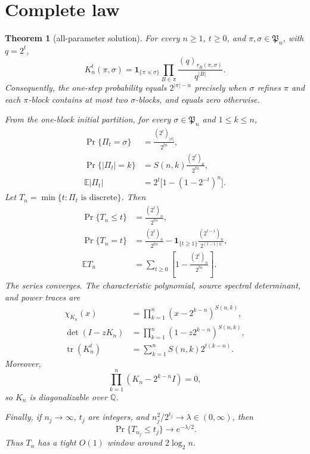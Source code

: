\documentclass[10pt]{article}
\newtheorem{theorem}{Theorem}
\newcommand{\Part}{\mathfrak P}
\newcommand{\fall}[2]{(#1)_{#2}}
\begin{document}
\section{Complete law}

\begin{theorem}[all-parameter solution]\label{thm:main}
For every $n\geq1$, $t\geq0$, and $\pi,\sigma\in\Part_n$, with $q=2^t$,
\begin{equation}\label{eq:t-kernel}
 K_n^t(\pi,\sigma)=
 \mathbf 1_{\{\pi\preceq\sigma\}}
 \prod_{B\in\pi}\frac{\fall q{r_B(\pi,\sigma)}}{q^{|B|}}.
\end{equation}
Consequently, the one-step probability equals $2^{|\pi|-n}$ precisely when
$\sigma$ refines $\pi$ and each $\pi$-block contains at most two
$\sigma$-blocks, and equals zero otherwise.

From the one-block initial partition, for every $\sigma\in\Part_n$ and
$1\leq k\leq n$,
\begin{align}
 \Pr\{\Pi_t=\sigma\}&=\frac{\fall {2^t}{|\sigma|}}{2^{tn}},
 \label{eq:partition-law}\\
 \Pr\{|\Pi_t|=k\}&=S(n,k)\frac{\fall {2^t}k}{2^{tn}},
 \label{eq:block-law}\\
 \mathbb E|\Pi_t|&=2^t\bigl[1-(1-2^{-t})^n\bigr].
 \label{eq:mean-blocks}
\end{align}
Let $T_n=\min\{t:\Pi_t\text{ is discrete}\}$.  Then
\begin{align}
 \Pr\{T_n\leq t\}&=\frac{\fall {2^t}n}{2^{tn}},
 \label{eq:cdf}\\
 \Pr\{T_n=t\}&=\frac{\fall {2^t}n}{2^{tn}}
 -\mathbf 1_{\{t\geq1\}}\frac{\fall {2^{t-1}}n}{2^{(t-1)n}},
 \label{eq:mass}\\
 \mathbb ET_n&=\sum_{t\geq0}
 \left[1-\frac{\fall {2^t}n}{2^{tn}}\right].
 \label{eq:mean-time}
\end{align}
The series converges.  The characteristic polynomial, source spectral
determinant, and power traces are
\begin{align}
 \chi_{K_n}(x)&=\prod_{k=1}^n
    (x-2^{k-n})^{S(n,k)},\label{eq:charpoly}\\
 \det(I-zK_n)&=\prod_{k=1}^n
    (1-z2^{k-n})^{S(n,k)},\label{eq:det}\\
 \operatorname{tr}(K_n^t)&=\sum_{k=1}^nS(n,k)2^{t(k-n)}.
 \label{eq:trace}
\end{align}
Moreover,
\begin{equation}\label{eq:annihilator}
 \prod_{k=1}^n(K_n-2^{k-n}I)=0,
\end{equation}
so $K_n$ is diagonalizable over $\mathbb Q$.

Finally, if $n_j\to\infty$, $t_j$ are integers, and
$n_j^2/2^{t_j}\to\lambda\in(0,\infty)$, then
\begin{equation}\label{eq:critical}
 \Pr\{T_{n_j}\leq t_j\}\longrightarrow e^{-\lambda/2}.
\end{equation}
Thus $T_n$ has a tight $O(1)$ window around $2\log_2n$.
\end{theorem}
\end{document}
